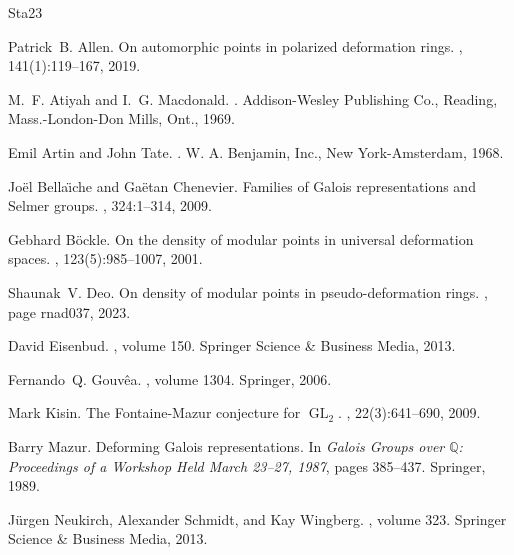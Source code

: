 \documentclass[12pt]{amsart}
\theoremstyle{plain}
\theoremstyle{definition}
\theoremstyle{remark}
\begin{document}
\begin{thebibliography}{{Sta}23}

Patrick~B. Allen.
\newblock On automorphic points in polarized deformation rings.
, 141(1):119--167, 2019.

M.~F. Atiyah and I.~G. Macdonald.
.
\newblock Addison-Wesley Publishing Co., Reading, Mass.-London-Don Mills, Ont.,
  1969.

Emil Artin and John Tate.
.
\newblock W. A. Benjamin, Inc., New York-Amsterdam, 1968.

Jo{\"e}l Bella{\"\i}che and Ga{\"e}tan Chenevier.
\newblock Families of {Galois} representations and {Selmer} groups.
, 324:1--314, 2009.

Gebhard B{\"o}ckle.
\newblock On the density of modular points in universal deformation spaces.
, 123(5):985--1007, 2001.

Shaunak~V. Deo.
\newblock On density of modular points in pseudo-deformation rings.
, page rnad037, 2023.

David Eisenbud.
,
  volume 150.
\newblock Springer Science \& Business Media, 2013.

Fernando~Q. Gouv{\^e}a.
, volume 1304.
\newblock Springer, 2006.

Mark Kisin.
\newblock The {Fontaine-Mazur} conjecture for $\operatorname{GL}_2$.
, 22(3):641--690,
  2009.

Barry Mazur.
\newblock Deforming {G}alois representations.
\newblock In {\em Galois Groups over $\mathbb{Q}$: Proceedings of a Workshop
  Held March 23--27, 1987}, pages 385--437. Springer, 1989.

J{\"u}rgen Neukirch, Alexander Schmidt, and Kay Wingberg.
, volume 323.
\newblock Springer Science \& Business Media, 2013.


\end{thebibliography}
\end{document}
